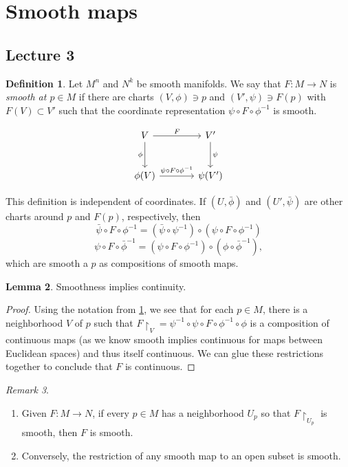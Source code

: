 \documentclass[10pt,letterpaper,cm]{nupset}
\theoremstyle{definition}
\newtheorem{definition}{Definition}[subsection]
\theoremstyle{theorem}
\newtheorem{lemma}[definition]{Lemma}
\theoremstyle{remark}
\newtheorem{remark}[definition]{Remark}
\newcommand{\1}{\mathbf{1}}
\newcommand{\0}{\vec 0}
\begin{document}
\section{Smooth maps}

\subsection{Lecture 3}

\begin{definition}\label{smap}
Let $M^n$ and $N^k$ be smooth manifolds. We say that $F: M \to N$ is \textit{smooth at $p \in M$} if there are charts $(V, \phi) \ni p$ and $(V', \psi) \ni F(p)$ with $F(V) \subset V'$ such that the coordinate representation $\psi \circ F \circ \phi^{-1}$ is smooth.
\end{definition}
\[
\begin{tikzcd}[row sep=large, column sep = large]
V \arrow[r, "F"] \arrow[d, "\phi", swap]
& V' \arrow[d, "\psi"] \\
\phi(V) \arrow[r, "\psi \circ F \circ \phi^{-1}"]
& \psi(V')
\end{tikzcd}
\]

This definition is independent of coordinates. If $(U, \bar{\phi})$ and $(U', \bar{\psi})$ are other charts around $p$ and $F(p)$, respectively, then $$\bar{\psi} \circ F \circ \phi^{-1} = (\bar{\psi} \circ \psi^{-1}) \circ (\psi \circ F \circ \phi^{-1})$$ $$\psi \circ F\circ \bar{\phi}^{-1} = (\psi \circ F \circ \phi^{-1}) \circ (\phi \circ \bar{\phi}^{-1}),$$ which are smooth a $p$ as compositions of smooth maps.

\begin{lemma}
Smoothness implies continuity.
\end{lemma}
\begin{proof}
Using the notation from \cref{smap}, we see that for each $p\in M$, there is a neighborhood $V$ of $p$ such that $F\restriction_V =  \psi^{-1} \circ \psi \circ F \circ \phi^{-1} \circ \phi$ is a composition of continuous maps (as we know smooth implies continuous for maps between Euclidean spaces) and thus itself continuous. We can glue these restrictions together to conclude that $F$ is continuous. 
\end{proof}


\begin{remark} $ $
\begin{enumerate}
\item Given $F:M\to N$, if every $p\in M$ has a neighborhood $U_p$ so that $F\restriction_{U_p}$ is smooth, then $F$ is smooth.
\item Conversely, the restriction of any smooth map to an open subset is smooth. 
\end{enumerate}
\end{remark}
\end{document}
